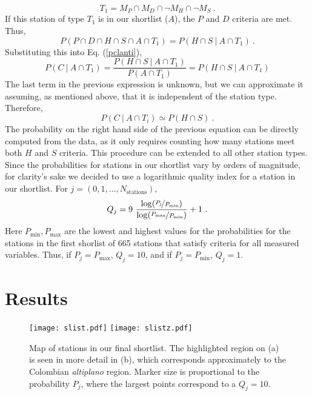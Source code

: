 \documentclass[12pt]{iopart}
\begin{document}
\begin{equation}
T_1=M_P\cap M_D\cap\neg M_H\cap\neg M_S\ .
\end{equation}
If this station of type $T_1$ is in our shortlist ($A$), the $P$ and $D$ criteria are met. Thus,
\begin{equation}
P(P\cap D\cap H\cap S\cap A\cap T_1)=P( H\cap S\ |\ A\cap T_1)\ .
\end{equation}
Substituting this into Eq. (\ref{pclanti}),
\begin{equation}
P(C\ |\ A\cap T_1)=\frac{P( H\cap S\ |\ A\cap T_1)}{P(A\cap T_1)}=P(H\cap S\ |\ A\cap T_1)
\end{equation}
The last term in the previous expression is unknown, but we can approximate it assuming, as mentioned above, that it is independent of the station type. Therefore, 
\begin{equation}
P(C\ |\ A\cap T_i)\simeq P(H\cap S)\ .
\end{equation}
The probability on the right hand side of the previous equation can be directly computed from the data, as it only requires counting how many stations meet both $H$ and $S$ criteria. This procedure can be extended to all other station types.\\

Since the probabilities for stations in our shortlist vary by orders of magnitude, for clarity's sake we decided to use a logarithmic quality index for a station in our shortlist. For $j=(0,1,...,N_\mathrm{stations})$,
\begin{equation}
Q_j=9\ \frac{\log (\nicefrac{P_\mathrm{j}}{P_\mathrm{min}})}{\log (\nicefrac{P_\mathrm{max}}{P_\mathrm{min}})}+1\ .
\end{equation}
Here $P_\mathrm{min},P_\mathrm{max}$ are the lowest and highest values for the probabilities for the stations in the first shorlist of 665 stations that satisfy criteria for all measured variables. Thus, if $P_j=P_\mathrm{max}$, $Q_j=10$, and if $P_j=P_\mathrm{min}$, $Q_j=1$.


\section{Results}

\begin{figure}
\begin{center}
\texttt{[image: slist.pdf]}
\texttt{[image: slistz.pdf]}
\caption{Map of stations in our final shortlist. The highlighted region on (a) is seen in more detail in (b), which corresponds approximately to the Colombian \emph{altiplano} region. Marker size is proportional to the probability $P_j$, where the largest points correspond to a $Q_j=10$.}\label{shortlist}
\end{center}
\end{figure}
\end{document}
